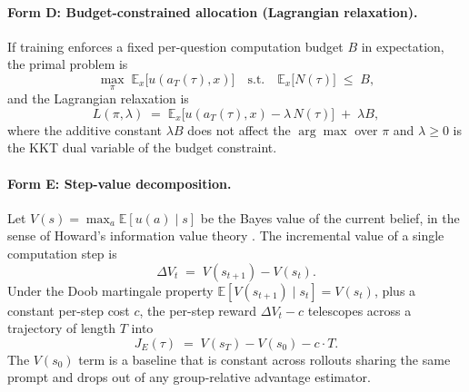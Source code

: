 \paragraph{Form D: Budget-constrained allocation (Lagrangian relaxation).}
If training enforces a fixed per-question computation budget $B$ in expectation, the primal problem is
\begin{equation}
\max_{\pi}\; \mathbb{E}_{x}\bigl[u(a_T(\tau), x)\bigr] \quad \text{s.t.} \quad \mathbb{E}_{x}\bigl[N(\tau)\bigr] \;\le\; B,
\label{eq:form-D-primal}
\end{equation}
and the Lagrangian relaxation is
\begin{equation}
L(\pi, \lambda) \;=\; \mathbb{E}_{x}\bigl[u(a_T(\tau),x) - \lambda\,N(\tau)\bigr] \;+\; \lambda B,
\label{eq:form-D}
\end{equation}
where the additive constant $\lambda B$ does not affect the $\arg\max$ over $\pi$ and $\lambda \ge 0$ is the KKT dual variable of the budget constraint.

\paragraph{Form E: Step-value decomposition.}
Let $V(s) = \max_{a}\mathbb{E}[u(a)\mid s]$ be the Bayes value of the current belief, in the sense of Howard's information value theory \citep{howard1966info}. The incremental value of a single computation step is
\begin{equation}
\Delta V_t \;=\; V(s_{t+1}) - V(s_t).
\label{eq:form-E-step}
\end{equation}
Under the Doob martingale property $\mathbb{E}[V(s_{t+1})\mid s_t] = V(s_t)$, plus a constant per-step cost $c$, the per-step reward $\Delta V_t - c$ telescopes across a trajectory of length $T$ into
\begin{equation}
J_E(\tau) \;=\; V(s_T) - V(s_0) - c\cdot T.
\label{eq:form-E}
\end{equation}
The $V(s_0)$ term is a baseline that is constant across rollouts sharing the same prompt and drops out of any group-relative advantage estimator.


